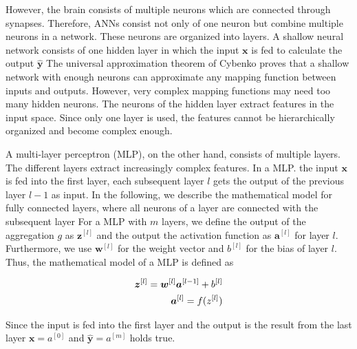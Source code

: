 However, the brain consists of multiple neurons which are connected through synapses.
Therefore, ANNs consist not only of one neuron but combine multiple neurons in a network. 
These neurons are organized into layers.
A shallow neural network consists of one hidden layer in which the input \(\boldsymbol{x}\) is fed to calculate the output \(\boldsymbol{\hat{y}}\)%
The universal approximation theorem of Cybenko  proves that a shallow network with enough neurons can approximate any mapping function between inputs and outputs.
However, very complex mapping functions may need too many hidden neurons.
The neurons of the hidden layer extract features in the input space.
Since only one layer is used, the features cannot be hierarchically organized and become complex enough.

A multi-layer perceptron (MLP), on the other hand, consists of multiple layers.
The different layers extract increasingly complex features.
In a MLP. the input \(\boldsymbol{x}\) is fed into the first layer, each subsequent layer \(l\) gets the output of the previous layer \(l-1\) as input.
In the following, we describe the mathematical model for fully connected layers, where all neurons of a layer are connected with the subsequent layer%
For a MLP with \(m\) layers, we define the output of the aggregation \(g\) as \(\boldsymbol{z}^{[l]}\) and the output the activation function as \(\boldsymbol{a}^{[l]}\) for layer \(l\).
Furthermore, we use \(\boldsymbol{w}^{[l]}\) for the weight vector and \(b^{[l]}\) for the bias of layer \(l\).
Thus, the mathematical model of a MLP is defined as

\begin{equation}\eqlbl{mlp}
	\begin{aligned}
		\boldsymbol{z}^{[l]} = \boldsymbol{w}^{[l]}\boldsymbol{a}^{[l-1]} + b^{[l]}\\
		\boldsymbol{a}^{[l]} = f({z}^{[l]})
	\end{aligned}
\end{equation}

Since the input is fed into the first layer and the output is the result from the last layer \(\boldsymbol{x} = {a}^{[0]}\) and \(\boldsymbol{\hat{y}} = {a}^{[m]}\) holds true.

